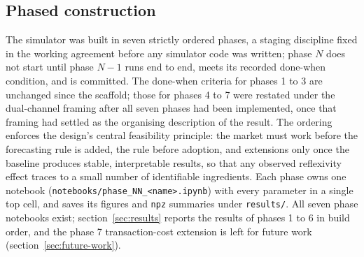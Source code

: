 \documentclass[12pt]{article}
\begin{document}
\subsection{Phased construction}

The simulator was built in seven strictly ordered phases, a staging discipline fixed in the working agreement before any simulator code was written; phase $N$ does not start until phase $N-1$ runs end to end, meets its recorded done-when condition, and is committed. %
The done-when criteria for phases 1 to 3 are unchanged since the scaffold; those for phases 4 to 7 were restated under the dual-channel framing after all seven phases had been implemented, once that framing had settled as the organising description of the result. %
The ordering enforces the design's central feasibility principle: the market must work before the forecasting rule is added, the rule before adoption, and extensions only once the baseline produces stable, interpretable results, so that any observed reflexivity effect traces to a small number of identifiable ingredients. %
Each phase owns one notebook (\texttt{notebooks/phase\_NN\_<name>.ipynb}) with every parameter in a single top cell, and saves its figures and \texttt{npz} summaries under \texttt{results/}. All seven phase notebooks exist; section~\ref{sec:results} reports the results of phases 1 to 6 in build order, and the phase 7 transaction-cost extension is left for future work (section~\ref{sec:future-work}). %
\end{document}
